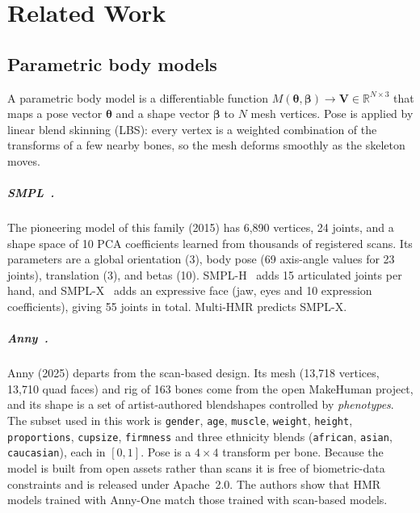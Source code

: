 \chapter{Related Work}
\label{ch:related}

\section{Parametric body models}

A parametric body model is a differentiable function
$M(\boldsymbol{\theta},\boldsymbol{\beta}) \rightarrow \mathbf{V}\in\mathbb{R}^{N\times 3}$
that maps a pose vector $\boldsymbol{\theta}$ and a shape vector
$\boldsymbol{\beta}$ to $N$ mesh vertices. Pose is applied by linear blend
skinning (LBS): every vertex is a weighted combination of the transforms of a
few nearby bones, so the mesh deforms smoothly as the skeleton moves.

\paragraph{SMPL~\cite{loper2015smpl}.} The pioneering model of this family
(2015) has 6,890 vertices, 24 joints, and a shape space of 10 PCA coefficients
learned from thousands of registered scans. Its parameters are a global
orientation (3), body pose (69 axis-angle values for 23 joints), translation
(3), and betas (10). SMPL-H~\cite{romero2017mano} adds 15 articulated joints per
hand, and SMPL-X~\cite{pavlakos2019smplx} adds an expressive face (jaw, eyes and
10 expression coefficients), giving 55 joints in total. Multi-HMR predicts
SMPL-X.

\paragraph{Anny~\cite{bregier2025anny}.} Anny (2025) departs from the
scan-based design. Its mesh (13,718 vertices, 13,710 quad faces) and rig of
163 bones come from the open MakeHuman project, and its shape is a set of
artist-authored blendshapes controlled by \emph{phenotypes}. The subset used
in this work is \texttt{gender}, \texttt{age}, \texttt{muscle}, \texttt{weight},
\texttt{height}, \texttt{proportions}, \texttt{cupsize}, \texttt{firmness} and
three ethnicity blends (\texttt{african}, \texttt{asian}, \texttt{caucasian}),
each in $[0,1]$. Pose is a $4{\times}4$ transform per bone. Because the model
is built from open assets rather than scans it is free of biometric-data
constraints and is released under Apache~2.0. The authors show that HMR
models trained with Anny-One match those trained with scan-based models.

